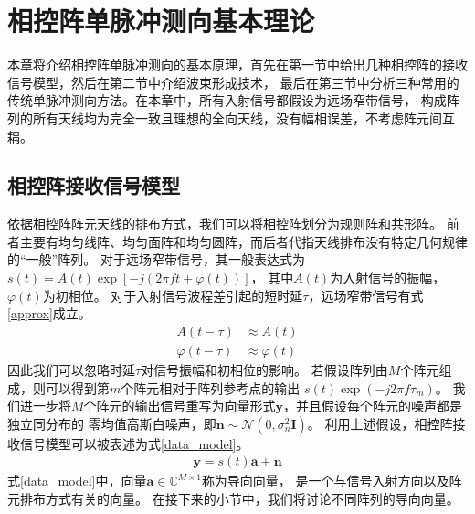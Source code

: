 \documentclass[master]{thesis-uestc}
\begin{document}
\chapter{相控阵单脉冲测向基本理论}
本章将介绍相控阵单脉冲测向的基本原理，首先在第一节中给出几种相控阵的接收信号模型，然后在第二节中介绍波束形成技术，
最后在第三节中分析三种常用的传统单脉冲测向方法。在本章中，所有入射信号都假设为远场窄带信号，
构成阵列的所有天线均为完全一致且理想的全向天线，没有幅相误差，不考虑阵元间互耦。

\section{相控阵接收信号模型}
依据相控阵阵元天线的排布方式，我们可以将相控阵划分为规则阵和共形阵。
前者主要有均匀线阵、均匀面阵和均匀圆阵，而后者代指天线排布没有特定几何规律的“一般”阵列。
对于远场窄带信号，其一般表达式为$s(t)=A(t)\exp\left[-j\left(2\pi ft+\varphi(t)\right)\right]$，
其中$A(t)$为入射信号的振幅，$\varphi(t)$为初相位。
对于入射信号波程差引起的短时延$\tau$，远场窄带信号有式\eqref{approx}成立。
\begin{equation}\label{approx}
\begin{aligned}
    A(t-\tau) &\approx A(t) \\
    \varphi(t-\tau) &\approx \varphi(t)
\end{aligned}
\end{equation}
因此我们可以忽略时延$\tau$对信号振幅和初相位的影响。
若假设阵列由$M$个阵元组成，则可以得到第$m$个阵元相对于阵列参考点的输出
$s(t)\exp\left(-j2\pi f\tau_m\right)$。
我们进一步将$M$个阵元的输出信号重写为向量形式$\bm{y}$，并且假设每个阵元的噪声都是独立同分布的
零均值高斯白噪声，即$\bm{n}\sim\mathcal{N}\left(0,\sigma^2_n\bm{I}\right)$。
利用上述假设，相控阵接收信号模型可以被表述为式\eqref{data_model}。
\begin{equation}\label{data_model}
    \begin{aligned}
        \bm{y} = s(t)\bm{a} + \bm{n}
    \end{aligned}
\end{equation}
式\eqref{data_model}中，向量$\bm{a}\in\mathbb{C}^{M\times1}$称为导向向量，
是一个与信号入射方向以及阵元排布方式有关的向量。
在接下来的小节中，我们将讨论不同阵列的导向向量。
\end{document}
